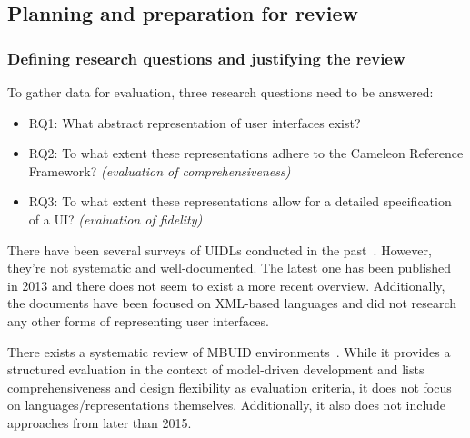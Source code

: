 \subsection[Planning and preparation]{Planning and preparation for review}\label{subsec:planning-and-preparation-for-review}

\subsubsection{Defining research questions and justifying the review}
To gather data for evaluation, three research questions need to be answered:
\begin{itemize}
    \item RQ1: What abstract representation of user interfaces exist?
    \item RQ2: To what extent these representations adhere to the Cameleon Reference Framework? \textit{(evaluation of comprehensiveness)}
    \item RQ3: To what extent these representations allow for a detailed specification of a UI? \textit{(evaluation of fidelity)}
\end{itemize}

There have been several surveys of UIDLs conducted in the past~\cite{souchon_review_2003, guerrero_garcia_theoretical_2009, guerrero_garcia_theoretical_2011, Jovanovic2013}.
However, they’re not systematic and well-documented.
The latest one has been published in 2013 and there does not seem to exist a more recent overview.
Additionally, the documents have been focused on XML-based languages and did not research any other forms of representing user interfaces.

There exists a systematic review of MBUID environments~\cite{Ruiz2018}.
While it provides a structured evaluation in the context of model-driven development and lists comprehensiveness and design flexibility as evaluation criteria, it does not focus on languages/representations themselves.
Additionally, it also does not include approaches from later than 2015.

